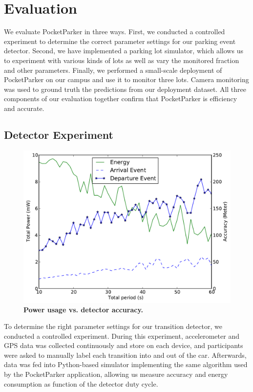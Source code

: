 \section{Evaluation}
\label{sec-evaluation}

We evaluate PocketParker in three ways. First, we conducted a controlled
experiment to determine the correct parameter settings for our parking event
detector. Second, we have implemented a parking lot simulator, which allows
us to experiment with various kinds of lots as well as vary the monitored
fraction and other parameters. Finally, we performed a small-scale deployment
of PocketParker on our campus and use it to monitor three lots. Camera
monitoring was used to ground truth the predictions from our deployment
dataset. All three components of our evaluation together confirm that
PocketParker is efficiency and accurate.

\subsection{Detector Experiment}

\begin{figure}
\centering
\includegraphics[width=\columnwidth]{./figures/Energy_accuracy.pdf}

\caption{\textbf{Power usage vs. detector accuracy.} }

\label{fig-energy}
\end{figure}



To determine the right parameter settings for our transition detector, we
conducted a controlled experiment. During this experiment, accelerometer and
GPS data was collected continuously and store on each device, and
participants were asked to manually label each transition into and out of the
car. Afterwards, data was fed into Python-based simulator implementing the
same algorithm used by the PocketParker application, allowing us measure
accuracy and energy consumption as function of the detector duty cycle.

